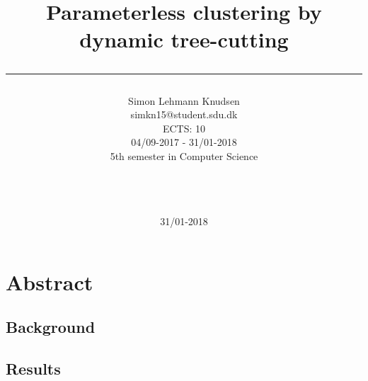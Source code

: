 \documentclass[a4paper,10pt]{article}
\title{ Parameterless clustering by dynamic tree-cutting \rule{10cm}{0.5mm}}
\author{Simon Lehmann Knudsen \\
	simkn15@student.sdu.dk \\
	ECTS: 10 \\
	04/09-2017 - 31/01-2018 \\
	5th semester in Computer Science
\\\rule{5.5cm}{0.5mm}\\}
\date{31/01-2018}
\theoremstyle{plain}
\theoremstyle{definition}
\begin{document}
\maketitle

\newpage
\tableofcontents

\newpage
\section{Abstract}

\subsection{Background}

\subsection{Results}
\end{document}
